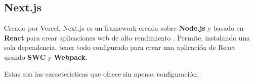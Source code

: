 \documentclass[12pt,twoside,titlepage]{report}
\begin{document}
\subsection{Next.js}
\label{sec:Next}

Creado por Vercel, Next.js es un framework creado sobre \textbf{Node.js} y basado en \textbf{React} para crear aplicaciones web de alto rendimiento \cite{nextjs1}.
Permite, instalando una sola dependencia, tener todo configurado para crear una aplicación de React usando \textbf{SWC} y \textbf{Webpack}. 

Estas son las características \cite{nextjs2} que ofrece sin apenas configuración:
\end{document}
